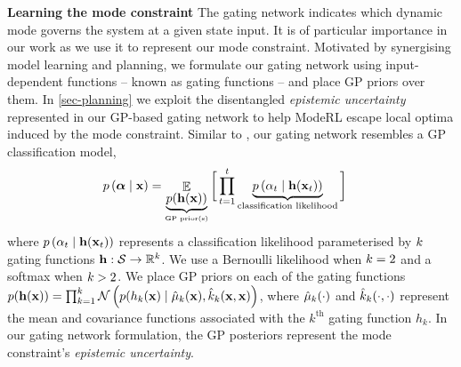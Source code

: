 \documentclass[twoside]{article}
\DeclareMathOperator{\E}{\mathbb{E}}
\newcommand{\numData}{\ensuremath{t}}
\newcommand{\modeInd}{\ensuremath{k}}
\newcommand{\NumData}{\ensuremath{\MakeUppercase{\numData}}}
\newcommand{\ModeInd}{\ensuremath{\MakeUppercase{\modeInd}}}
\newcommand{\allData}[1]{\ensuremath{\MakeUppercase{#1}}}
\newcommand{\mode}[1]{\ensuremath{#1_{\modeInd}}}
\newcommand{\state}{\ensuremath{\mathbf{x}}}
\newcommand{\x}{\ensuremath{\mathbf{x}}}
\newcommand{\singleInput}{\ensuremath{\x_{\numData-1}}}
\newcommand{\allInput}{\ensuremath{\allData{\x}}}
\newcommand{\allState}{\ensuremath{\allData{\state}}}
\newcommand{\modeVar}{\ensuremath{\alpha}}
\newcommand{\gatingFunc}{\ensuremath{h}}
\newcommand{\GatingFunc}{\ensuremath{\mathbf{\gatingFunc}}}
\begin{document}
\textbf{Learning the mode constraint}
The gating network indicates which dynamic mode governs the system at a given state input.
It is of particular importance in our work as we use it to represent our mode constraint.
Motivated by synergising model learning and planning, we formulate our gating network using input-dependent functions --
known as gating functions -- and place GP priors over them.
In \cref{sec-planning} we exploit the disentangled \emph{epistemic uncertainty} represented in our
GP-based gating network to help ModeRL escape local optima induced by the mode constraint.
Similar to \cite{trespMixtures2000a}, our gating network resembles a GP classification model,
\begin{align} \label{eq-prob-mass}
\npmoeGatingPosterior &= \E_{\underbrace{p(\GatingFunc(\allState)) }_{\text{GP prior(s)}}} \bigg[ \prod_{\numData=1}^{\NumData}
\underbrace{p \left(\modeVar_{\timeInd} \mid \GatingFunc(\state_{\timeInd}) \right)}_{\text{classification likelihood}} \bigg]
\end{align}
where \(p\left(\modeVar_{\timeInd} \mid \GatingFunc(\state_{\timeInd})\right)\) represents a classification likelihood parameterised by \(\ModeInd\) gating
functions \(\GatingFunc: \stateDomain \rightarrow \mathbb{R}^{\ModeInd}\).
We use a Bernoulli likelihood when \(\ModeInd=2\) and a softmax when \(\ModeInd>2\).
We place GP priors on each of the gating functions
\(p(\GatingFunc(\allInput)) = \prod_{\modeInd=1}^\ModeInd \mathcal{N}\left( p(\mode{\gatingFunc}(\allInput) \mid \gatingMeanFunc(\allInput), \gatingCovFunc(\allInput, \allInput) \right)\),
where \(\gatingMeanFunc(\cdot)\) and \(\gatingCovFunc(\cdot,\cdot)\) represent the mean and covariance functions
associated with the \(\modeInd^\text{th}\) gating function \(\mode{\gatingFunc}\).
In our gating network formulation, the GP posteriors represent the mode constraint's \emph{epistemic uncertainty}.
\newline
\end{document}
